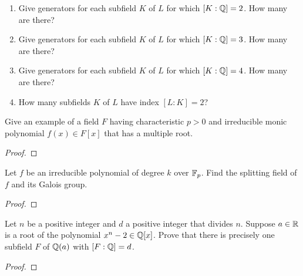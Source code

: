 \begin{problem}
\begin{enumerate}[label=(\alph*)]
\item Give generators for each subfield $K$ of $L$ for which
  $[K:\mathbb{Q}]=2$. How many are there?
\item Give generators for each subfield $K$ of $L$ for which
  $[K:\mathbb{Q}]=3$. How many are there?
\item Give generators for each subfield $K$ of $L$ for which
  $[K:\mathbb{Q}]=4$. How many are there?
\item How many subfields $K$ of $L$ have index $[L:K]=2$?
\end{enumerate}
\end{problem}

\begin{problem}
Give an example of a field $F$ having characteristic $p>0$ and irreducible
monic polynomial $f(x)\in F[x]$ that has a multiple root.
\begin{proof}

\end{proof}
\end{problem}

\begin{problem}
Let $f$ be an irreducible polynomial of degree $k$ over $\mathbb{F}_p$. Find the
splitting field of $f$ and its Galois group.
\begin{proof}
\end{proof}
\end{problem}

\begin{problem}
Let $n$ be a positive integer and $d$ a positive integer that divides
$n$. Suppose $a\in\mathbb{R}$ is a root of the polynomial
$x^n-2\in\mathbb{Q}[x]$. Prove that there is precisely one subfield $F$ of
$\mathbb{Q}(a)$ with $[F:\mathbb{Q}]=d$.
\begin{proof}
\end{proof}
\end{problem}

